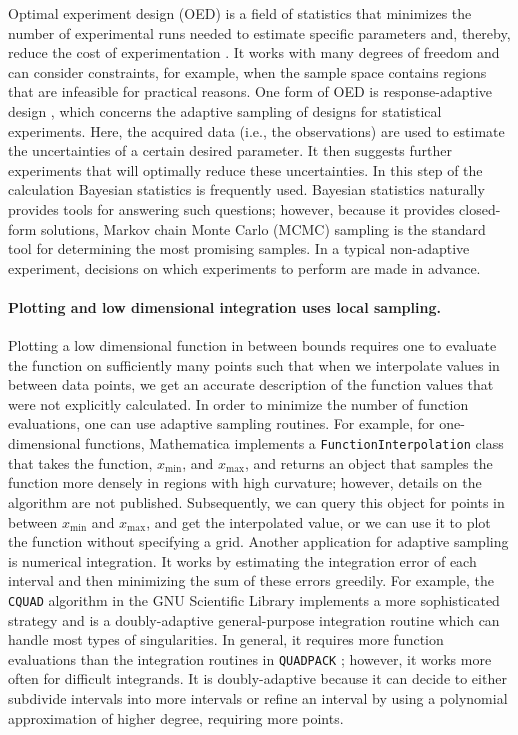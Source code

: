 \documentclass[english, twocolumn, 10pt, aps, superscriptaddress, floatfix, prb, citeautoscript]{revtex4-1}
\renewcommand{\citep}{\cite}
\newcommand{\passthrough}[1]{\lstset{mathescape=false}#1\lstset{mathescape=true}}
\begin{document}
Optimal experiment design (OED) is a field of statistics that minimizes the number of experimental runs needed to estimate specific parameters and, thereby, reduce the cost of experimentation \citep{Emery1998}.
It works with many degrees of freedom and can consider constraints, for example, when the sample space contains regions that are infeasible for practical reasons.
One form of OED is response-adaptive design \citep{Hu2006}, which concerns the adaptive sampling of designs for statistical experiments.
Here, the acquired data (i.e., the observations) are used to estimate the uncertainties of a certain desired parameter.
It then suggests further experiments that will optimally reduce these uncertainties.
In this step of the calculation Bayesian statistics is frequently used.
Bayesian statistics naturally provides tools for answering such questions; however, because it provides closed-form solutions, Markov chain Monte Carlo (MCMC) sampling is the standard tool for determining the most promising samples.
In a typical non-adaptive experiment, decisions on which experiments to perform are made in advance.

\paragraph{Plotting and low dimensional integration uses local sampling.}

Plotting a low dimensional function in between bounds requires one to evaluate the function on sufficiently many points such that when we interpolate values in between data points, we get an accurate description of the function values that were not explicitly calculated.
In order to minimize the number of function evaluations, one can use adaptive sampling routines.
For example, for one-dimensional functions, Mathematica \citep{WolframResearch} implements a \passthrough{\lstinline!FunctionInterpolation!} class that takes the function, \(x_\textrm{min}\), and \(x_\textrm{max}\), and returns an object that samples the function more densely in regions with high curvature; however, details on the algorithm are not published.
Subsequently, we can query this object for points in between \(x_\textrm{min}\) and \(x_\textrm{max}\), and get the interpolated value, or we can use it to plot the function without specifying a grid.
Another application for adaptive sampling is numerical integration.
It works by estimating the integration error of each interval and then minimizing the sum of these errors greedily.
For example, the \passthrough{\lstinline!CQUAD!} algorithm \citep{Gonnet2010} in the GNU Scientific Library \citep{Galassi1996} implements a more sophisticated strategy and is a doubly-adaptive general-purpose integration routine which can handle most types of singularities.
In general, it requires more function evaluations than the integration routines in \passthrough{\lstinline!QUADPACK!} \citep{Galassi1996}; however, it works more often for difficult integrands.
It is doubly-adaptive because it can decide to either subdivide intervals into more intervals or refine an interval by using a polynomial approximation of higher degree, requiring more points.
\end{document}
